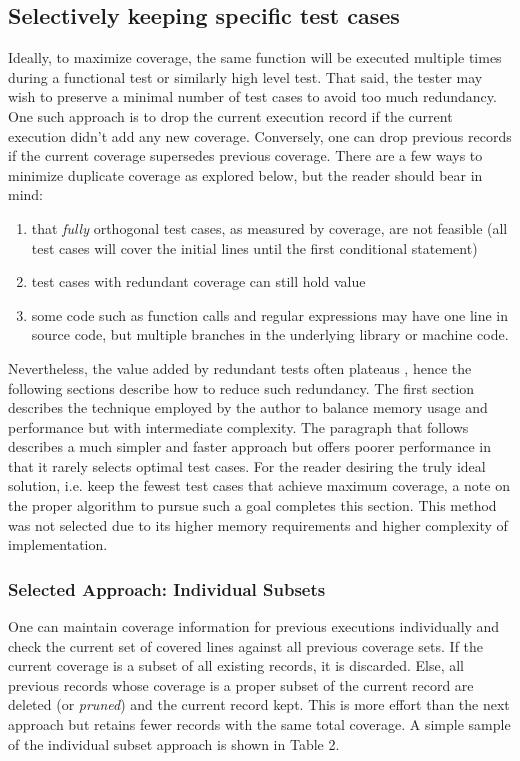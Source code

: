 \documentclass[10pt, conference]{IEEEtran}
\begin{document}
\subsection{Selectively keeping specific test cases}\label{sec:tuning-1}
Ideally, to maximize coverage, the same function will be executed multiple 
times during a functional test or similarly high level test.  That said, 
the tester may wish to preserve 
a minimal number of test cases to avoid too much redundancy.  
One such approach is to drop the current execution
record if the current execution didn’t add any new coverage.  
Conversely, one can drop previous records if the current coverage supersedes
previous coverage.
There are a few ways to minimize duplicate coverage as explored below, 
but the reader should bear in mind:

\begin{enumerate}
  \item that \textit{fully} orthogonal test cases, as measured by coverage, are not feasible 
  (all test cases will cover the initial lines until the first conditional statement) 
  \item test cases with redundant coverage can still hold value
  \item some code such as function calls and regular expressions may have one 
  line in source code, but multiple branches in the underlying library or machine code.
\end{enumerate}

Nevertheless, the value added by redundant tests often plateaus 
\cite{lemieux2023codamosa}, hence the following sections
describe how to reduce such redundancy.  The first section describes
the technique employed by the author to balance memory usage and performance but
with intermediate complexity. The paragraph that follows describes a much simpler and faster
approach but offers poorer performance in that it rarely selects optimal test 
cases.  For the reader desiring the truly ideal solution, i.e. keep the fewest test cases that achieve
maximum coverage, a note on the proper algorithm to pursue such a goal completes
this section. This method was not selected due to its higher memory
requirements and higher complexity of implementation.
 
\subsubsection{Selected Approach: Individual Subsets}\label{sec:tuning-2}
One can maintain coverage information for previous
executions individually and check the current set of covered lines
against all previous coverage sets.  If the current coverage is
a subset of all existing records, it is discarded.  
Else, all previous records whose coverage is 
a proper subset of the current record are deleted (or \textit{pruned})
and the current record kept. This is more effort than the next approach but
retains fewer records with the same total coverage.  
A simple sample of the individual subset approach is shown in Table 2.
\end{document}
